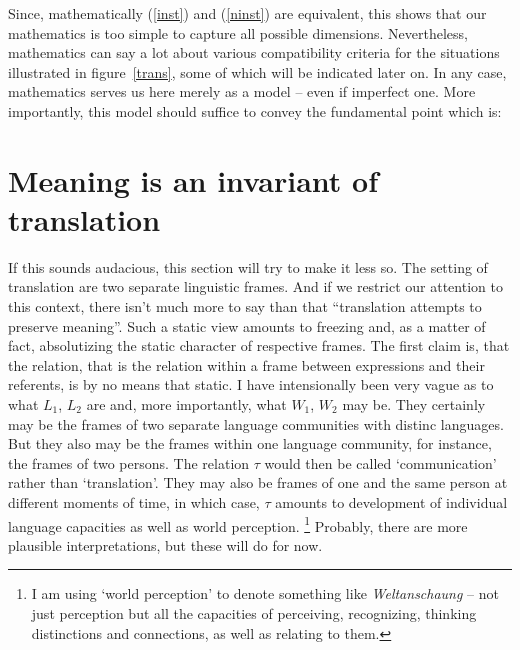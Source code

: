 \documentclass[10pt]{article}
\newcommand{\refe}[1]{(\ref{#1})}
\newcommand{\<}{\langle}
\renewcommand{\>}{\rangle}
\newcommand{\wo}[1]{`#1'}
\begin{document}
Since, mathematically \refe{inst} and \refe{ninst} are 
equivalent, this shows that our mathematics is too simple to capture all 
possible dimensions. Nevertheless, mathematics can say a lot about various 
compatibility criteria for the situations illustrated in 
figure~\ref{trans}, some of which will be indicated later on. In any case, 
mathematics serves us here merely as a model -- even if imperfect one. More 
importantly, this model should suffice to convey the fundamental point 
which is:

\section{Meaning is an invariant of translation}
If this sounds audacious, this section will try to make it less so. The 
setting of translation are two separate linguistic frames. And if we restrict 
our attention to this context, there isn't much more to say than that 
``translation attempts to preserve meaning''. Such a static view amounts to 
freezing and, as a matter of fact, absolutizing the static character of 
respective frames. The first claim is, that the relation, that is the 
relation within a frame between expressions and their referents, is by no 
means that static. I have intensionally been very 
vague as to what $L_1$, $L_2$ are and, more importantly, what $W_1$, $W_2$ 
may be. They certainly may be the frames of two separate language communities 
with distinc languages. But they also may be the frames within one 
language community, for instance, the frames of two persons. The 
relation $\tau$ would then be called \wo{communication} rather than 
\wo{translation}. They may also be frames of one and the same person at 
different moments of time, in which case, $\tau$ amounts to development of 
individual language capacities as well as world perception. \footnote{I am 
using \wo{world perception} to denote something like {\em Weltanschaung} -- not 
just perception but all the 
capacities of perceiving, recognizing, thinking distinctions and 
connections, as well as relating to them.} 
Probably, there are more plausible interpretations, but 
these will do for now.
\end{document}
